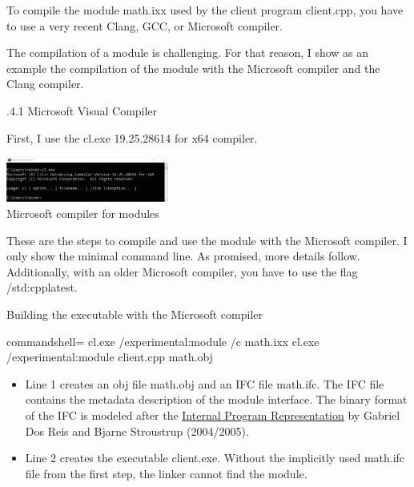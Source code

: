 
To compile the module math.ixx used by the client program client.cpp, you have to use a very recent Clang, GCC, or Microsoft compiler.

The compilation of a module is challenging. For that reason, I show as an example the compilation of the module with the Microsoft compiler and the Clang compiler.

.4.1\hspace{0.2cm} Microsoft Visual Compiler

First, I use the cl.exe 19.25.28614 for x64 compiler.

\begin{center}
\includegraphics[width=0.4\textwidth]{content/3/chapter4/images/18.png}\\
Microsoft compiler for modules
\end{center}

These are the steps to compile and use the module with the Microsoft compiler. I only show the minimal command line. As promised, more details follow. Additionally, with an older Microsoft compiler, you have to use the flag /std:cpplatest.

\noindent
Building the executable with the Microsoft compiler
\begin{tcblisting}{commandshell={}}
cl.exe /experimental:module /c math.ixx
cl.exe /experimental:module client.cpp math.obj
\end{tcblisting}

\begin{itemize}
\item 
Line 1 creates an obj file math.obj and an IFC file math.ifc. The IFC file contains the metadata description of the module interface. The binary format of the IFC is modeled after the \href{https://www.stroustrup.com/gdr-bs-macis09.pdf}{Internal Program Representation} by Gabriel Dos Reis and Bjarne Stroustrup (2004/2005).

\item 
Line 2 creates the executable client.exe. Without the implicitly used math.ifc file from the first step, the linker cannot find the module.
\end{itemize}

